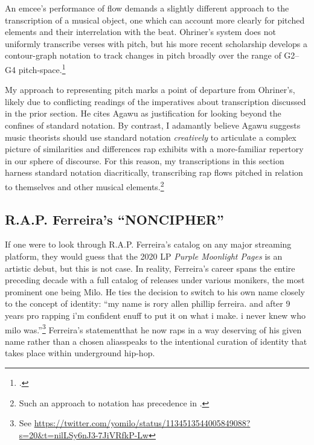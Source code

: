 An emcee's performance of flow demands a slightly different approach to the transcription of a musical object, 
one which can account more clearly for pitched elements and their interrelation with the beat. Ohriner's system
does not uniformly transcribe verses with pitch, but his more recent scholarship develops a contour-graph notation
to track changes in pitch broadly over the range of G2--G4 pitch-space.\footnote{
    \cite{mitchellohrinerAnalysingPitchContent2019}.}

My approach to representing pitch marks a point of departure from Ohriner's, likely due to conflicting
readings of the imperatives about transcription discussed in the prior section. He cites Agawu as 
justification for looking beyond the confines of standard notation. By contrast, I adamantly believe Agawu
suggests music theorists should use standard notation \textit{creatively} to articulate a complex picture of 
similarities and differences rap exhibits with a more-familiar repertory in our sphere of discourse. For this
reason, my transcriptions in this section harness standard notation diacritically, transcribing rap flows 
pitched in relation to themselves and other musical elements.\footnote{
    Such an approach to notation has precedence in \cite{robertkomanieckiVocalPitchRap2020}.}

\subsection*{\centering R.A.P. Ferreira's ``NONCIPHER''}

If one were to look through R.A.P. Ferreira's catalog on any major streaming platform, they would guess that
the 2020 LP \textit{Purple Moonlight Pages} is an artistic debut, but this is not case. In reality, Ferreira's
career spans the entire preceding decade with a full catalog of releases under various monikers, the most 
prominent one being Milo. He ties the decision to switch to his own name closely to the concept of identity:
``my name is rory allen phillip ferreira. and after 9 years pro rapping i'm confident enuff to put it on what
i make. i never knew who milo was.''\footnote{
    See \href{https://twitter.com/yomilo/status/1134513544005849088?s=20\&t=nilLSy6nJ3-7JiVRfkP-Lw}
    {https://twitter.com/yomilo/status/1134513544005849088?s=20\&t=nilLSy6nJ3-7JiVRfkP-Lw}}
Ferreira's statement\textemdash that he now raps in a way deserving of his given name rather than 
a chosen alias\textemdash speaks to the intentional curation of identity that takes place within 
underground hip-hop.

